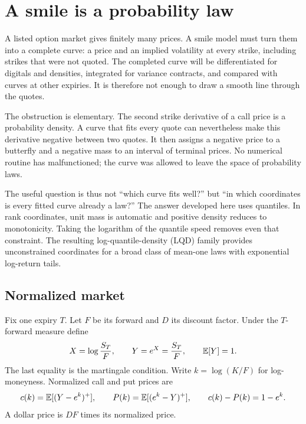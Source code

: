 \section{A smile is a probability law}
\label{sec:intro}

A listed option market gives finitely many prices.  A smile model must turn
them into a complete curve: a price and an implied volatility at every strike,
including strikes that were not quoted.  The completed curve will be
differentiated for digitals and densities, integrated for variance contracts,
and compared with curves at other expiries.  It is therefore not enough to
draw a smooth line through the quotes.

The obstruction is elementary.  The second strike derivative of a call price
is a probability density.  A curve that fits every quote can nevertheless
make this derivative negative between two quotes.  It then assigns a negative
price to a butterfly and a negative mass to an interval of terminal prices.
No numerical routine has malfunctioned; the curve was allowed to leave the
space of probability laws.

The useful question is thus not ``which curve fits well?'' but ``in which
coordinates is every fitted curve already a law?''  The answer developed here
uses quantiles.  In rank coordinates, unit mass is automatic and positive
density reduces to monotonicity.  Taking the logarithm of the quantile speed
removes even that constraint.  The resulting log-quantile-density (LQD)
family provides unconstrained coordinates for a broad class of mean-one laws
with exponential log-return tails.

\subsection{Normalized market}

Fix one expiry $T$.  Let $F$ be its forward and $D$ its discount factor.  Under
the $T$-forward measure define
\begin{equation}
X=\log\frac{S_T}{F},\qquad Y=e^X=\frac{S_T}{F},\qquad \mathbb{E}[Y]=1.
\label{eq:Xdef}
\end{equation}
The last equality is the martingale condition.  Write
$k=\log(K/F)$ for log-moneyness.  Normalized call and put prices are
\begin{equation}
c(k)=\mathbb{E}[(Y-e^k)^+],\qquad P(k)=\mathbb{E}[(e^k-Y)^+],
\qquad c(k)-P(k)=1-e^k.
\label{eq:calldef}
\end{equation}
A dollar price is $DF$ times its normalized price.

